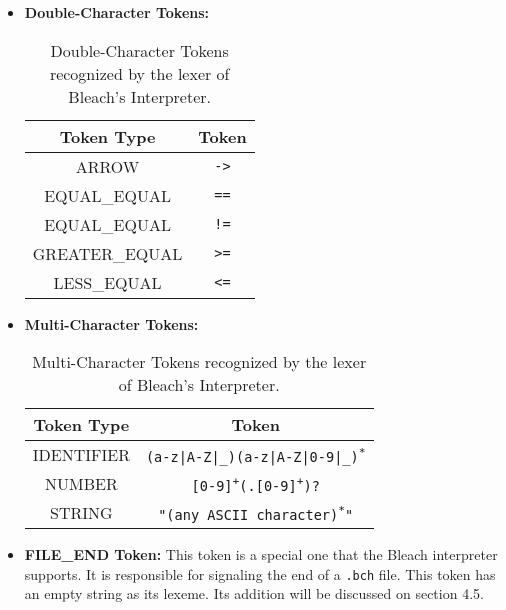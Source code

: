 \begin{itemize}
    \item \textbf{Double-Character Tokens:}
    \begin{table}[h!]
    \centering
        \begin{tabular}{|c|c|}
        \hline
        \textbf{Token Type} & \textbf{Token} \\ \hline
        ARROW & \texttt{->} \\
        EQUAL\_EQUAL & \texttt{==} \\
        EQUAL\_EQUAL & \texttt{!=} \\
        GREATER\_EQUAL & \texttt{>=} \\
        LESS\_EQUAL & \texttt{<=} \\ \hline     
        \end{tabular}
        \caption{Double-Character Tokens recognized by the lexer of Bleach's Interpreter.}
    \end{table}

    \item \textbf{Multi-Character Tokens:}
    \begin{table}[h!]
    \centering
        \begin{tabular}{|c|c|}
        \hline
        \textbf{Token Type} & \textbf{Token} \\ \hline
        IDENTIFIER & \texttt{(a-z|A-Z|\_)(a-z|A-Z|0-9|\_)\textsuperscript{*}} \\
        NUMBER & \texttt{[0-9]\textsuperscript{+}(.[0-9]\textsuperscript{+})?} \\
        STRING & \texttt{"(any ASCII character)\textsuperscript{*}"} \\ \hline      
        \end{tabular}
        \caption{Multi-Character Tokens recognized by the lexer of Bleach's Interpreter.}
    \end{table}

    \item \textbf{FILE\_END Token:} This token is a special one that the Bleach interpreter supports. It is responsible for signaling the end of a \texttt{.bch} file. This token has an empty string as its lexeme. Its addition will be discussed on section 4.5.
\end{itemize}


